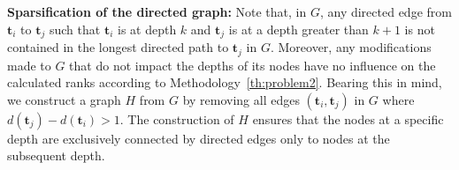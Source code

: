 \documentclass[acmsmall,screen, review]{acmart}
\begin{document}
\textbf{Sparsification of the directed graph:} Note that, in $G$, any directed edge from $\mathbf{t}_i$ to $\mathbf{t}_j$ such that $\mathbf{t}_i$ is at depth $k$ and $\mathbf{t}_j$ is at a depth greater than $k+1$ is not contained in the longest directed path to $\mathbf{t}_j$ in $G$.
Moreover, any modifications made to $G$ that do not impact the depths of its nodes have no influence on the calculated ranks according to Methodology~\ref{th:problem2}.
Bearing this in mind, we construct a graph $H$ from $G$ by removing all edges $(\mathbf{t}_i, \mathbf{t}_j)$ in $G$ where $d(\mathbf{t}_j) - d(\mathbf{t}_i) > 1$. The construction of $H$ ensures that the nodes at a specific depth are exclusively connected by directed edges only to nodes at the subsequent depth. 

\end{document}
